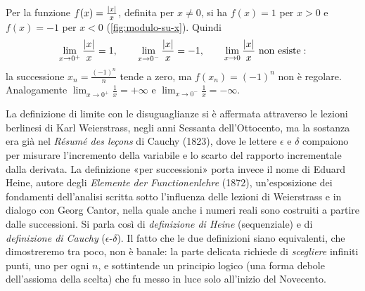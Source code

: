 \begin{marginfigure}
\centering
{}
\caption{La funzione $\frac{\abs x}{x}$: limite destro $1$ e limite sinistro $-1$ in
$x_{0}=0$; il limite (bilatero) non esiste.}
\label{fig:modulo-su-x}
\end{marginfigure}

\begin{esempio}\label{es:modulo-su-x}
Per la funzione $f(x)=\frac{\lvert x\rvert}{x}$, definita per $x\neq0$, si ha $f(x)=1$ per
$x>0$ e $f(x)=-1$ per $x<0$ (\cref{fig:modulo-su-x}). Quindi
\begin{equation}\label{eq:modulo-su-x}
  \lim_{x\to0^{+}}\frac{\lvert x\rvert}{x}=1, \qquad \lim_{x\to0^{-}}\frac{\lvert x\rvert}{x}=-1,
  \qquad \lim_{x\to0}\frac{\lvert x\rvert}{x}\ \text{non esiste}:
\end{equation}
la successione $x_{n}=\frac{(-1)^{n}}n$ tende a zero, ma $f(x_{n})=(-1)^{n}$ non è
regolare. Analogamente $\lim_{x\to0^{+}}\frac1x=+\infty$ e $\lim_{x\to0^{-}}\frac1x=-\infty$.
\end{esempio}

\begin{notastorica}
La definizione di limite con le disuguaglianze si è affermata attraverso le lezioni
berlinesi di Karl Weierstrass, negli anni Sessanta dell'Ottocento, ma la sostanza era già
nel \emph{Résumé des leçons} di Cauchy (1823), dove le lettere $\epsilon$ e $\delta$
compaiono per misurare l'incremento della variabile e lo scarto del rapporto
incrementale dalla derivata. La definizione
«per successioni» porta invece il nome di Eduard Heine, autore degli \emph{Elemente der
Functionenlehre} (1872), un'esposizione dei fondamenti dell'analisi scritta sotto
l'influenza delle lezioni di Weierstrass e in dialogo con Georg Cantor, nella quale
anche i numeri reali sono costruiti a partire dalle successioni. Si parla così di
\emph{definizione di Heine} (sequenziale) e di \emph{definizione di Cauchy}
($\epsilon$-$\delta$).
Il fatto che le due definizioni siano equivalenti, che dimostreremo tra poco, non è
banale: la parte delicata richiede di \emph{scegliere} infiniti punti, uno per ogni
$n$, e sottintende un principio logico (una forma debole dell'assioma della scelta) che
fu messo in luce solo all'inizio del Novecento.
\end{notastorica}
